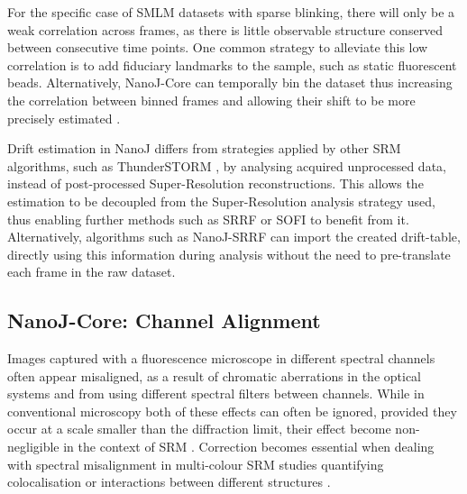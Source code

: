  For the specific case of SMLM datasets with sparse blinking, there will only be a weak correlation across frames, as there is little observable structure conserved between consecutive time points. One common strategy to alleviate this low correlation is to add fiduciary landmarks to the sample, such as static fluorescent beads. Alternatively, NanoJ-Core can temporally bin the dataset thus increasing the correlation between binned frames and allowing their shift to be more precisely estimated \cite{mlodzianoski2011sample}. 

 Drift estimation in NanoJ differs from strategies applied by other SRM algorithms, such as ThunderSTORM \cite{ovesny2014thunderstorm}, by analysing acquired unprocessed data, instead of post-processed Super-Resolution reconstructions. This allows the estimation to be decoupled from the Super-Resolution analysis strategy used, thus enabling further methods such as SRRF or SOFI \cite{dertinger2009fast} to benefit from it. Alternatively, algorithms such as NanoJ-SRRF can import the created drift-table, directly using this information during analysis without the need to pre-translate each frame in the raw dataset.

\subsection*{NanoJ-Core: Channel Alignment}

 Images captured with a fluorescence microscope in different spectral channels often appear misaligned, as a result of chromatic aberrations in the optical systems and from using different spectral filters between channels. While in conventional microscopy both of these effects can often be ignored, provided they occur at a scale smaller than the diffraction limit, their effect become non-negligible in the context of SRM \cite{erdelyi2013correcting}. Correction becomes essential when dealing with spectral misalignment in multi-colour SRM studies quantifying colocalisation or interactions between different structures \cite{bock2007two,van2009multicolor,niekamp2017high}. 
 
